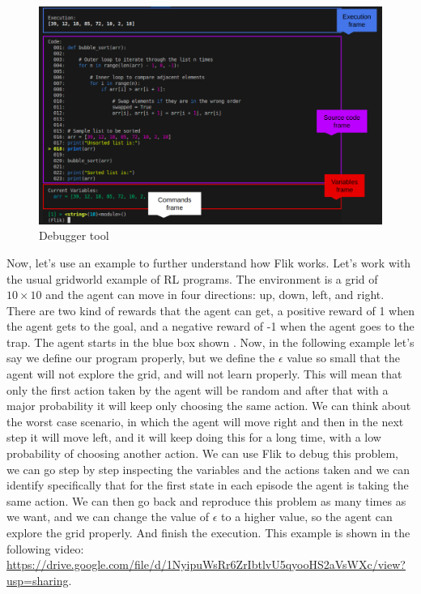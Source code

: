 \begin{figure}[h]
    \centering
    \includegraphics[width=1\textwidth]{figures/flik_interface.png}
    \caption{Debugger tool}
    \label{fig:debuggerf}
\end{figure}

Now, let's use an example to further understand how \ac{Flik} works. Let's work with 
the usual gridworld example of \ac{RL} programs. The environment is a grid of 
$10 \times 10$ and the agent can move in four directions: up, down, left, and right.
There are two kind of rewards that the agent can get, a positive reward of 1 when 
the agent gets to the goal, and a negative reward of -1 when the agent goes to the 
trap. The agent starts in the blue box shown . Now, in the following
example let's say we define our program properly, but we define the $\epsilon$ value 
so small that the agent will not explore the grid, and will not learn properly. 
This will mean that only the first action taken by the agent will be random and after that
with a major probability it will keep only choosing the same action. We can think about 
the worst case scenario, in which the agent will move right and then in the next step it 
will move left, and it will keep doing this for a long time, with a low probability of 
choosing another action. We can use \ac{Flik} to debug this problem, we can go step by step
inspecting the variables and the actions taken and we can identify specifically that for 
the first state in each episode the agent is taking the same action. We can then go back and
reproduce this problem as many times as we want, and we can change the value of $\epsilon$
to a higher value, so the agent can explore the grid properly. And finish the execution.
This example is shown in the following video: \url{https://drive.google.com/file/d/1NyipuWsRr6ZrIbtlvU5qyooHS2aVsWXc/view?usp=sharing}.



\endinput

